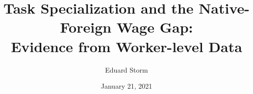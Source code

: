 \documentclass[10pt]{beamer}
\title[Task Specialization \& NF Wage Gap]{Task Specialization and the Native-Foreign Wage Gap: \\ Evidence from Worker-level Data} %
\author{Eduard Storm} %
\institute[estorm@carleton.edu]
{
	
	
	\medskip 
	
	Department of Economics \\  
	Carleton College \\ %
	
	\bigskip
	
	 Job Market Paper Presentation for: \\
		\smallskip
	\textit{RWI Essen}
}
\date{January 21, 2021} %
\begin{document}
\begin{frame}
\titlepage %
\end{frame}






 
 
 
 
 
 

\end{document}
